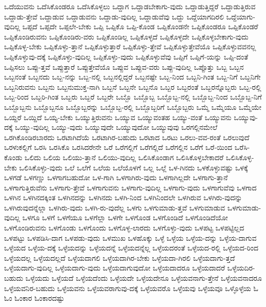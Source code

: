 {ಒದೆಯುವನು
ಒದೆಸಿಕೊಂಡರೂ
ಒದೆಸಿಕೊಳ್ಳಲು
ಒದ್ದಾಗ
ಒದ್ದಾಡಬೇಕಾಗು-ವುದು
ಒದ್ದಾಡುತ್ತಿದ್ದರೆ
ಒದ್ದಾಡುತ್ತಿರುವ
ಒದ್ದಾಡು-ತ್ತೇವೆ
ಒದ್ದಾಡುವ
ಒದ್ದಾಡುವನು
ಒದ್ದಾಡು-ವುದಿಲ್ಲ
ಒದ್ದಾಡುವೆವು
ಒದ್ದು
ಒದ್ದೆಯಾಗದಿರಲಿ
ಒದ್ದೆಯಾಗು-ವುದಿಲ್ಲ
ಒಪ್ಪದೆ
ಒಪ್ಪದೇ
ಒಪ್ಪಲೇ-ಬೇಕು
ಒಪ್ಪಿ
ಒಪ್ಪಿಕೊ
ಒಪ್ಪಿ-ಕೊಂಡ
ಒಪ್ಪಿಕೊಂಡನೇ
ಒಪ್ಪಿಕೊಂಡರೂ
ಒಪ್ಪಿಕೊಂಡರೆ
ಒಪ್ಪಿಕೊಂಡಿರುವನು
ಒಪ್ಪಿಕೊಂಡಿರು-ವರು
ಒಪ್ಪಿಕೊಂಡಿಲ್ಲ
ಒಪ್ಪಿಕೊಳ್ಳದೆ
ಒಪ್ಪಿಕೊಳ್ಳದೇ
ಒಪ್ಪಿಕೊಳ್ಳಬೇಕಾಗು-ವುದು
ಒಪ್ಪಿಕೊಳ್ಳ-ಬೇಕು
ಒಪ್ಪಿಕೊಳ್ಳು-ತ್ತಾನೆ
ಒಪ್ಪಿಕೊಳ್ಳುತ್ತಾರೆ
ಒಪ್ಪಿಕೊಳ್ಳು-ತ್ತೇವೆ
ಒಪ್ಪಿಕೊಳ್ಳುತ್ತೇವೆಯೊ
ಒಪ್ಪಿಕೊಳ್ಳುವವನಲ್ಲ
ಒಪ್ಪಿಕೊಳ್ಳುವು-ದಕ್ಕೆ
ಒಪ್ಪಿಕೊಳ್ಳು-ವುದಿಲ್ಲ
ಒಪ್ಪಿಕೊಳ್ಳು-ವುದು
ಒಪ್ಪಿಕೊಳ್ಳುವೆವು
ಒಪ್ಪಿಗೆ
ಒಪ್ಪಿಗೆ-ಯನ್ನು
ಒಪ್ಪಿ-ದಂತೆ
ಒಪ್ಪಿಸಲು
ಒಪ್ಪು-ತ್ತವೆ
ಒಪ್ಪುತ್ತಾರೆ
ಒಪ್ಪುತ್ತೇವೆಯೊ
ಒಪ್ಪುವ
ಒಪ್ಪುವ-ವರು
ಒಪ್ಪು-ವುದಿಲ್ಲ
ಒಪ್ಪೊತ್ತು
ಒಬ್ಬ
ಒಬ್ಬನ
ಒಬ್ಬನಂತೆ
ಒಬ್ಬನದು
ಒಬ್ಬ-ನನ್ನು
ಒಬ್ಬ-ನಲ್ಲಿ
ಒಬ್ಬನಲ್ಲಿದ್ದರೆ
ಒಬ್ಬನಷ್ಟೇ
ಒಬ್ಬ-ನಿಂದ
ಒಬ್ಬನಿ-ಗಿಂತ
ಒಬ್ಬ-ನಿಗೆ
ಒಬ್ಬನಿಗೇ
ಒಬ್ಬನಿರುವನು
ಒಬ್ಬನು
ಒಬ್ಬನುಮುಕ್ತ-ನಾಗಿ
ಒಬ್ಬನೆ
ಒಬ್ಬನೇ
ಒಬ್ಬನೊ
ಒಬ್ಬರ
ಒಬ್ಬರಂತೆ
ಒಬ್ಬರನ್ನೊಬ್ಬರು
ಒಬ್ಬ-ರಲ್ಲಿ
ಒಬ್ಬ-ರಿಂದ
ಒಬ್ಬರಿ-ಗಿಂತ
ಒಬ್ಬರು
ಒಬ್ಬರೆ
ಒಬ್ಬರೇ
ಒಬ್ಬೊ
ಒಬ್ಬೊಬ್ಬ
ಒಬ್ಬೊಬ್ಬ-ನಲ್ಲಿ
ಒಬ್ಬೊಬ್ಬ-ನಿಂದ
ಒಬ್ಬೊಬ್ಬ-ನಿಗೆ
ಒಬ್ಬೊಬ್ಬನು
ಒಬ್ಬೊಬ್ಬನೂ
ಒಬ್ಬೊಬ್ಬರನ್ನು
ಒಬ್ಬೊಬ್ಬ-ರಲ್ಲಿ
ಒಬ್ಬೊಬ್ಬರಿಗೆ
ಒಬ್ಬೊಬ್ಬರು
ಒಮ್ಮೆ
ಒಮ್ಮೆಯೂ
ಒಮ್ಮೆಯೇ
ಒಯ್ದರೆ
ಒಯ್ದಿದೆ
ಒಯ್ಯ-ಬೇಕು
ಒಯ್ಯುತ್ತಿರುವನು
ಒಯ್ಯುವ
ಒಯ್ಯುವಂತಹ
ಒಯ್ಯು-ವಂತೆ
ಒಯ್ಯುವನು
ಒಯ್ಯುವು-ದಕ್ಕೆ
ಒಯ್ಯು-ವುದಿಲ್ಲ
ಒಯ್ಯು-ವುದು
ಒಯ್ಯುವುದೇ
ಒಯ್ಯುವುದೋ
ಒಯ್ಯುವುವು
ಒರಗಲ್ಲಿನಮೇಲೆ
ಒರಗಿಕೊಂಡಿರಬಾರದು
ಒರಟಾಗಿದೆಯೆ
ಒರಟಾಗಿರ-ಬಹುದು
ಒರಟಾದ
ಒರಟು
ಒರಲು-ವವ-ರಂತೆ
ಒರಲುವುದೆ
ಒರಳುಕಲ್ಲಿಗೆ
ಒರಸಿ
ಒರಸಿಕೊ
ಒರಸಿದರೇನೇ
ಒರೆ
ಒರೆಗಲ್ಲಿಗೆ
ಒರೆಗಲ್ಲಿದೆ
ಒರೆಗಲ್ಲಿನ
ಒರೆಗೆ
ಒರೆ-ಯಿಂದ
ಒರೆಸಿ-ಕೊಂಡು
ಒಲಿದು
ಒಲಿಯ
ಒಲಿಯು-ತ್ತಾನೆ
ಒಲಿಯು-ವುದಿಲ್ಲ
ಒಲಿಸಿಕೊಂಡಾಗ
ಒಲಿಸಿಕೊಳ್ಳಬೇಕಾದರೆ
ಒಲಿಸಿಕೊಳ್ಳ-ಬೇಕು
ಒಲಿಸಿಕೊಳ್ಳು-ವುದು
ಒಲೆ
ಒಲೆಗೆ
ಒಲೆಯ
ಒಲೆಯೊಳಗೆ
ಒಲ್ಲ
ಒಲ್ಲೆ
ಒಳ-ಗಿನದು
ಒಳಕೊಳ್ಳುವಷ್ಟು
ಒಳಕ್ಕೆ
ಒಳಗಡೆ
ಒಳಗಣ್ಣು
ಒಳಗಾಗಬಹುದೋ
ಒಳ-ಗಾಗಿ
ಒಳಗಾಗಿರು-ವುದು
ಒಳಗಾಗಿಲ್ಲದೇ
ಒಳಗಾಗು-ತ್ತಾನೆ
ಒಳಗಾಗುತ್ತಿರುವೆನು
ಒಳಗಾಗು-ತ್ತೇವೆ
ಒಳಗಾಗುವನು
ಒಳಗಾಗು-ವುದಿಲ್ಲ
ಒಳಗಾಗು-ವುದು
ಒಳಗಾಗುವೆವು
ಒಳಗಾದ
ಒಳಗಿನ
ಒಳಗಿನದಕ್ಕಿಂತ
ಒಳಗಿನದನ್ನು
ಒಳಗಿನದು
ಒಳಗಿ-ನಿಂದ
ಒಳಗಿನಿಂದಲೇ
ಒಳಗಿರುವ
ಒಳಗಿರು-ವುದನ್ನು
ಒಳಗಿರುವುದನ್ನೆಲ್ಲಾ
ಒಳಗಿರು-ವುದು
ಒಳಗಿ-ರು-ವುದೆಲ್ಲ
ಒಳಗು
ಒಳಗುಮಾಡು-ತ್ತವೆ
ಒಳಗುಮಾಡುವ
ಒಳಗುಮಾಡು-ವುದಿಲ್ಲ
ಒಳಗೂ
ಒಳಗೆ
ಒಳಗೆಯೂ
ಒಳಗೆಲ್ಲಾ
ಒಳಗೇ
ಒಳಗೊಂಡ
ಒಳಗೊಂಡಿದೆ
ಒಳಗೊಂಡಿದೆಯೋ
ಒಳಗೊಂಡಿರುವನು
ಒಳಗೊಂಡು
ಒಳಗೊಂದು
ಒಳಗೊಳ್ಳ-ಲಾರದು
ಒಳಗೊಳ್ಳು-ವುದು
ಒಳಪಟ್ಟ
ಒಳಪಟ್ಟಿಲ್ಲದ
ಒಳಪಟ್ಟು
ಒಳಪಡಿಸಿ-ದಾಗ
ಒಳಪಡು-ವುದು
ಒಳಮುಖ
ಒಳಹೊಕ್ಕು
ಒಳ್ಳೆ
ಒಳ್ಳೆಯ
ಒಳ್ಳೆಯ-ದನ್ನು
ಒಳ್ಳೆಯ-ದಾಗುವ
ಒಳ್ಳೆಯದ
ಒಳ್ಳೆಯ-ದಕ್ಕೆ
ಒಳ್ಳೆಯದನ್ನು
ಒಳ್ಳೆಯದನ್ನೆ
ಒಳ್ಳೆಯದನ್ನೆಲ್ಲ
ಒಳ್ಳೆಯದರಂತೆ
ಒಳ್ಳೆಯದ-ರಲ್ಲಿ
ಒಳ್ಳೆಯದ-ರಿಂದ
ಒಳ್ಳೆಯದಲ್ಲ
ಒಳ್ಳೆಯದಲ್ಲದೆ
ಒಳ್ಳೆಯದಾಗಲಿ
ಒಳ್ಳೆಯದಾಗಿರ-ಬೇಕು
ಒಳ್ಳೆಯದಾ-ಗಿರಲಿ
ಒಳ್ಳೆಯದಾಗು-ತ್ತದೆ
ಒಳ್ಳೆಯದಾಗು-ವುದಿಲ್ಲ
ಒಳ್ಳೆಯದಾಗು-ವುದು
ಒಳ್ಳೆಯದಾಗುವುದೋ
ಒಳ್ಳೆಯದಾದರೂ
ಒಳ್ಳೆಯದಾದರೆ
ಒಳ್ಳೆಯದಿರ-ಬಹುದು
ಒಳ್ಳೆಯದು
ಒಳ್ಳೆಯದೆ
ಒಳ್ಳೆಯದೆಂದು
ಒಳ್ಳೆಯದೇ
ಒಳ್ಳೆಯದೇನೂ
ಒಳ್ಳೆಯವನಾಗು-ತ್ತೇನೆ
ಒಳ್ಳೆಯವನಾದರೂ
ಒಳ್ಳೆಯವನಿರ-ಬಹುದು
ಒಳ್ಳೆಯವನು
ಒಳ್ಳೆಯವರಾಗುವು-ದಕ್ಕೆ
ಒಳ್ಳೆಯವರೊ
ಒಳ್ಳೆಯವು
ಒಳ್ಳೆಯವೂ
ಒಳ್ಳೊಳ್ಳೆಯ
ಓ
ಓಂ
ಓಂಕಾರ
ಓಂಕಾರದಷ್ಟು
}

